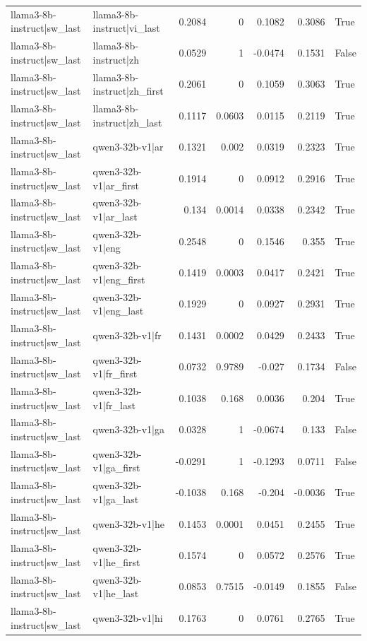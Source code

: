 \begin{table}
\begin{tabular}{l l r r r r l}
llama3-8b-instruct|sw_last & llama3-8b-instruct|vi_last & 0.2084 & 0 & 0.1082 & 0.3086 & True \\
llama3-8b-instruct|sw_last & llama3-8b-instruct|zh & 0.0529 & 1 & -0.0474 & 0.1531 & False \\
llama3-8b-instruct|sw_last & llama3-8b-instruct|zh_first & 0.2061 & 0 & 0.1059 & 0.3063 & True \\
llama3-8b-instruct|sw_last & llama3-8b-instruct|zh_last & 0.1117 & 0.0603 & 0.0115 & 0.2119 & True \\
llama3-8b-instruct|sw_last & qwen3-32b-v1|ar & 0.1321 & 0.002 & 0.0319 & 0.2323 & True \\
llama3-8b-instruct|sw_last & qwen3-32b-v1|ar_first & 0.1914 & 0 & 0.0912 & 0.2916 & True \\
llama3-8b-instruct|sw_last & qwen3-32b-v1|ar_last & 0.134 & 0.0014 & 0.0338 & 0.2342 & True \\
llama3-8b-instruct|sw_last & qwen3-32b-v1|eng & 0.2548 & 0 & 0.1546 & 0.355 & True \\
llama3-8b-instruct|sw_last & qwen3-32b-v1|eng_first & 0.1419 & 0.0003 & 0.0417 & 0.2421 & True \\
llama3-8b-instruct|sw_last & qwen3-32b-v1|eng_last & 0.1929 & 0 & 0.0927 & 0.2931 & True \\
llama3-8b-instruct|sw_last & qwen3-32b-v1|fr & 0.1431 & 0.0002 & 0.0429 & 0.2433 & True \\
llama3-8b-instruct|sw_last & qwen3-32b-v1|fr_first & 0.0732 & 0.9789 & -0.027 & 0.1734 & False \\
llama3-8b-instruct|sw_last & qwen3-32b-v1|fr_last & 0.1038 & 0.168 & 0.0036 & 0.204 & True \\
llama3-8b-instruct|sw_last & qwen3-32b-v1|ga & 0.0328 & 1 & -0.0674 & 0.133 & False \\
llama3-8b-instruct|sw_last & qwen3-32b-v1|ga_first & -0.0291 & 1 & -0.1293 & 0.0711 & False \\
llama3-8b-instruct|sw_last & qwen3-32b-v1|ga_last & -0.1038 & 0.168 & -0.204 & -0.0036 & True \\
llama3-8b-instruct|sw_last & qwen3-32b-v1|he & 0.1453 & 0.0001 & 0.0451 & 0.2455 & True \\
llama3-8b-instruct|sw_last & qwen3-32b-v1|he_first & 0.1574 & 0 & 0.0572 & 0.2576 & True \\
llama3-8b-instruct|sw_last & qwen3-32b-v1|he_last & 0.0853 & 0.7515 & -0.0149 & 0.1855 & False \\
llama3-8b-instruct|sw_last & qwen3-32b-v1|hi & 0.1763 & 0 & 0.0761 & 0.2765 & True \\

\end{tabular}
\end{table}

